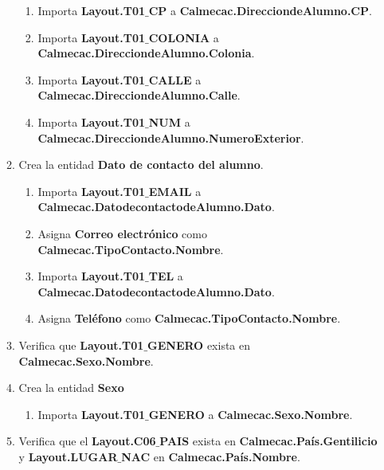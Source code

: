 \begin{enumerate}
\begin{enumerate}
\begin{enumerate}
			\item Importa \textbf{Layout.T01$\_$CP} a \textbf{Calmecac.DirecciondeAlumno.CP}.
			
			\item Importa \textbf{Layout.T01$\_$COLONIA} a \textbf{Calmecac.DirecciondeAlumno.Colonia}.
			
			\item Importa \textbf{Layout.T01$\_$CALLE} a \textbf{Calmecac.DirecciondeAlumno.Calle}. %
			
			\item Importa \textbf{Layout.T01$\_$NUM} a \textbf{Calmecac.DirecciondeAlumno.NumeroExterior}.
			
			\end{enumerate}
		
		\item Crea la entidad \textbf{Dato de contacto del alumno}.
		
			\begin{enumerate}
		
			\item Importa \textbf{Layout.T01$\_$EMAIL} a \textbf{Calmecac.DatodecontactodeAlumno.Dato}.
			
			\item Asigna \textbf{Correo electrónico} como \textbf{Calmecac.TipoContacto.Nombre}.
			
			\item Importa \textbf{Layout.T01$\_$TEL} a \textbf{Calmecac.DatodecontactodeAlumno.Dato}.
			
			\item Asigna \textbf{Teléfono} como \textbf{Calmecac.TipoContacto.Nombre}.
			
			\end{enumerate}
		
		\item Verifica que \textbf{Layout.T01$\_$GENERO} exista en \textbf{Calmecac.Sexo.Nombre}. 
		
		\item Crea la entidad \textbf{Sexo}
		
			\begin{enumerate}
		
			\item Importa \textbf{Layout.T01$\_$GENERO} a \textbf{Calmecac.Sexo.Nombre}.
		
			\end{enumerate}
	
		\item Verifica que el \textbf{Layout.C06$\_$PAIS} exista en \textbf{Calmecac.País.Gentilicio} y \textbf{Layout.LUGAR$\_$NAC} en \textbf{Calmecac.País.Nombre}. 
	

\end{enumerate}
\end{enumerate}
